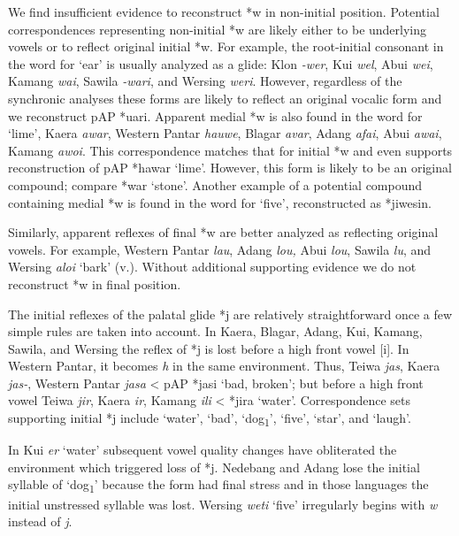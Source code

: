 We find insufficient evidence to reconstruct *w in non-initial position. Potential correspondences representing non-initial *w are likely either to be underlying vowels or to reflect original initial *w. For example, the root-initial consonant in the word for `ear' is usually analyzed as a glide: Klon \textit{{}-wer}, Kui \textit{wel}, Abui \textit{wei}, Kamang \textit{wai}, Sawila \textit{{}-wari}, and Wersing \textit{weri}. However, regardless of the synchronic analyses these forms are likely to reflect an original vocalic form and we reconstruct pAP *uari. Apparent medial *w is also found in the word for `lime', Kaera \textit{awar}, Western Pantar \textit{hauwe}, Blagar \textit{avar}, Adang\textit{ {\textglotstop}afai}, Abui \textit{awai}, Kamang \textit{awoi}. This correspondence matches that for initial *w and even supports reconstruction of pAP *hawar `lime'. However, this form is likely to be an original compound; compare *war `stone'. Another example of a potential compound containing medial *w is found in 
the word for `five', reconstructed as *jiwesin.

Similarly, apparent reflexes of final *w are better analyzed as reflecting original vowels. For example, Western Pantar \textit{lau}, Adang \textit{lou,} Abui \textit{lou}, Sawila \textit{lu}, and Wersing \textit{aloi} `bark' (v.). Without additional supporting evidence we do not reconstruct *w in final position.

The initial reflexes of the palatal glide *j are relatively straightforward once a few simple rules are taken into account. In Kaera, Blagar, Adang, Kui, Kamang, Sawila, and Wersing the reflex of *j is lost before a high front vowel [i]. In Western Pantar, it becomes \textit{h} in the same environment. Thus, Teiwa \textit{jas}, Kaera \textit{jas-}, Western Pantar \textit{jasa} {\textless} pAP *jasi `bad, broken'; but before a high front vowel Teiwa \textit{jir}, Kaera \textit{ir}, Kamang \textit{ili }{\textless} *jira `water'. Correspondence sets supporting initial *j include `water', `bad', `dog\textsubscript{1}', `five', `star', and `laugh'. 

In Kui \textit{e{\textlengthmark}r }`water' subsequent vowel quality changes have obliterated the environment which triggered loss of *j. Nedebang and Adang lose the initial syllable of `dog\textsubscript{1}' because the form had final stress and in those languages the initial unstressed syllable was lost. Wersing \textit{weti{\ng}} `five' irregularly begins with \textit{w} instead of \textit{j}. 

